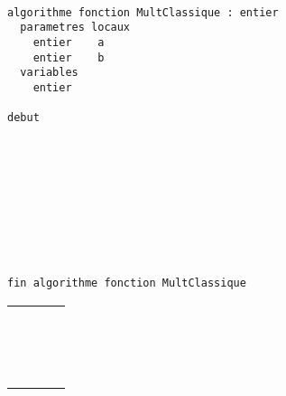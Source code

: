 \documentclass[11pt,a4paper]{article}
\begin{document}
\begin{table}[ht!]
  \centering
  \begin{minipage}{0.59\textwidth}
    \centering
\begin{lstlisting}[style=algorithmique]

algorithme fonction MultClassique : entier
  parametres locaux
    entier    a
    entier    b
  variables
    entier

debut










fin algorithme fonction MultClassique
 \end{lstlisting}
  \end{minipage}
  \hfillx
  \begin{minipage}{0.4\textwidth}
    \centering
    \begin{tabular}{|C{1cm}|C{1cm}|C{1cm}|C{1cm}|}
        \hline
             &     &     &     \\
        \hline
             &     &     &   \\
             &     &     &     \\
             &     &     &   \\
        \hline
             &     &     &   \\
             &     &     &     \\
             &     &     &   \\
        \hline
             &     &     &   \\
             &     &     &     \\
             &     &     &   \\
        \hline
             &     &     &   \\
             &     &     &     \\
             &     &     &   \\
        \hline
             &     &     &   \\
             &     &     &     \\
             &     &     &   \\
        \hline
    \end{tabular}
  \end{minipage}
\end{table}
\end{document}
